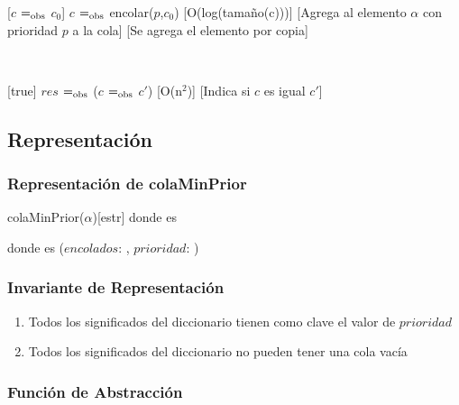 	[$c$ $=_{\mathrm{obs}}$ $c_0$]
	{$c$ $=_{\mathrm{obs}}$ encolar($p$,$c_0$)}
	[O(log(tamaño(c)))]
	[Agrega al elemento $\alpha$ con prioridad $p$ a la cola]
	[Se agrega el elemento por copia]

	~

	[true]
	{$res$ $=_{\mathrm{obs}}$ ($c$ $=_{\mathrm{obs}}$ $c'$)}
	[O(n$^2$)]
	[Indica si $c$ es igual $c'$]

\subsection{Representación}

	\subsubsection{Representación de colaMinPrior}

		\begin{Estructura}{colaMinPrior($\alpha$)}[estr]
			\- \- \- \- donde  es 

			\- \- \- \- donde  es
			($encolados$: ,
			$prioridad$: )
		\end{Estructura}

	\subsubsection{Invariante de Representación}

		\renewcommand{\labelenumi}{(\Roman{enumi})}

		\begin{enumerate}
			\item Todos los significados del diccionario tienen como clave
			el valor de $prioridad$
			\item Todos los significados del diccionario no pueden tener una
			cola vacía
		\end{enumerate}

	\mbox{}

	\subsubsection{Función de Abstracción}

